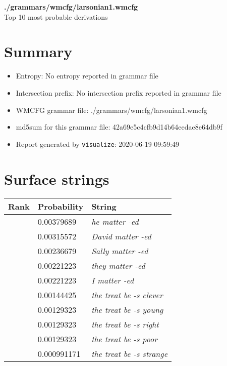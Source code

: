 \documentclass[11pt]{article}
\begin{document}
\begin{center}
{\huge \textbf{./grammars/wmcfg/larsonian1.wmcfg}} \\[0.5em]
{\normalsize Top 10 most probable derivations}
\end{center}

\section{Summary}
\begin{itemize}
	\item Entropy: No entropy reported in grammar file
	\item Intersection prefix: No intersection prefix reported in grammar file
	\item WMCFG grammar file: ./grammars/wmcfg/larsonian1.wmcfg
	\item md5sum for this grammar file: 42a69e5c4cfb9d14b64eedae8e64db9f
	\item Report generated by \texttt{visualize}: 2020-06-19 09:59:49
\end{itemize}

\section{Surface strings}
\hspace{1em}
\renewcommand{\arraystretch}{1.15}
\newcommand\rownumber{\stepcounter{rownumber}\arabic{rownumber}}
\begin{tabular}{l l l}
	\hline
	 Rank & Probability & String \\
	\hline
\rownumber & 0.00379689 & \textit{he matter -ed} \\
\rownumber & 0.00315572 & \textit{David matter -ed} \\
\rownumber & 0.00236679 & \textit{Sally matter -ed} \\
\rownumber & 0.00221223 & \textit{they matter -ed} \\
\rownumber & 0.00221223 & \textit{I matter -ed} \\
\rownumber & 0.00144425 & \textit{the treat be -s clever} \\
\rownumber & 0.00129323 & \textit{the treat be -s young} \\
\rownumber & 0.00129323 & \textit{the treat be -s right} \\
\rownumber & 0.00129323 & \textit{the treat be -s poor} \\
\rownumber & 0.000991171 & \textit{the treat be -s strange} \\
	\hline
\end{tabular}
\pagebreak
\end{document}

